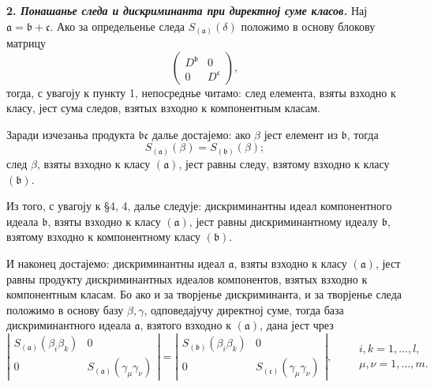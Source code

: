\documentclass[11pt]{article}
\begin{document}
\setcounter{footnote}{26}

\textbf{2. \emph{Понашанье следа и дискриминанта при директној суме класов.}} Нај $\mathfrak a=\mathfrak b+\mathfrak c$. Ако за определьенье следа $S_{(\mathfrak a)}(\delta)$ положимо в основу блокову матрицу
\[
        \begin{pmatrix}D^{\mathfrak b}&0\\0&D^{\mathfrak c}\end{pmatrix},
\]
тогда, с увагоју к пункту 1, непосреднье читамо: след елемента, взяты взходно к класу, јест сума следов, взятых взходно к компонентным класам.

Заради изчезаньа продукта $\mathfrak b\mathfrak c$ далье достајемо: ако $\beta$ јест елемент из $\mathfrak b$, тогда
\[
        S_{(\mathfrak a)}(\beta)=S_{(\mathfrak b)}(\beta);
\]
след $\beta$, взяты взходно к класу $(\mathfrak a)$, јест равны следу, взятому взходно к класу $(\mathfrak b)$.

Из того, с увагоју к §4, 4, далье следује: дискриминантны идеал компонентного идеала $\mathfrak b$, взяты взходно к класу $(\mathfrak a)$, јест равны дискриминантному идеалу $\mathfrak b$, взятому взходно к компонентному класу $(\mathfrak b)$.

И наконец достајемо: дискриминантны идеал $\mathfrak a$, взяты взходно к класу $(\mathfrak a)$, јест равны продукту дискриминантных идеалов компонентов, взятых взходно к компонентным класам. Бо ако и за творјенье дискриминанта, и за творјенье следа положимо в основу базу $\beta,\gamma$, одповедајучу директној суме, тогда база дискриминантного идеала $\mathfrak a$, взятого взходно к $(\mathfrak a)$, дана јест чрез
\[
\left|
\begin{array}{cc}
S_{(\mathfrak a)}(\beta_i\beta_k)&0\\
0&S_{(\mathfrak a)}(\gamma_\mu\gamma_\nu)
\end{array}
\right|
=
\left|
\begin{array}{cc}
S_{(\mathfrak b)}(\beta_i\beta_k)&0\\
0&S_{(\mathfrak c)}(\gamma_\mu\gamma_\nu)
\end{array}
\right|,
\qquad
\begin{matrix}
 i,k=1,\ldots,l,\\
 \mu,\nu=1,\ldots,m.
\end{matrix}
\]
\end{document}
